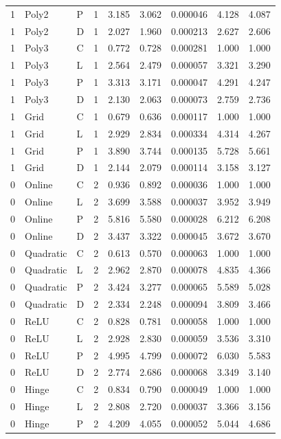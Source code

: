\begin{longtable}{lllrrrrrr}
1 & Poly2 & P & 1 & 3.185 & 3.062 & 0.000046 & 4.128 & 4.087 \\
1 & Poly2 & D & 1 & 2.027 & 1.960 & 0.000213 & 2.627 & 2.606 \\
1 & Poly3 & C & 1 & 0.772 & 0.728 & 0.000281 & 1.000 & 1.000 \\
1 & Poly3 & L & 1 & 2.564 & 2.479 & 0.000057 & 3.321 & 3.290 \\
1 & Poly3 & P & 1 & 3.313 & 3.171 & 0.000047 & 4.291 & 4.247 \\
1 & Poly3 & D & 1 & 2.130 & 2.063 & 0.000073 & 2.759 & 2.736 \\
1 & Grid & C & 1 & 0.679 & 0.636 & 0.000117 & 1.000 & 1.000 \\
1 & Grid & L & 1 & 2.929 & 2.834 & 0.000334 & 4.314 & 4.267 \\
1 & Grid & P & 1 & 3.890 & 3.744 & 0.000135 & 5.728 & 5.661 \\
1 & Grid & D & 1 & 2.144 & 2.079 & 0.000114 & 3.158 & 3.127 \\
0 & Online & C & 2 & 0.936 & 0.892 & 0.000036 & 1.000 & 1.000 \\
0 & Online & L & 2 & 3.699 & 3.588 & 0.000037 & 3.952 & 3.949 \\
0 & Online & P & 2 & 5.816 & 5.580 & 0.000028 & 6.212 & 6.208 \\
0 & Online & D & 2 & 3.437 & 3.322 & 0.000045 & 3.672 & 3.670 \\
0 & Quadratic & C & 2 & 0.613 & 0.570 & 0.000063 & 1.000 & 1.000 \\
0 & Quadratic & L & 2 & 2.962 & 2.870 & 0.000078 & 4.835 & 4.366 \\
0 & Quadratic & P & 2 & 3.424 & 3.277 & 0.000065 & 5.589 & 5.028 \\
0 & Quadratic & D & 2 & 2.334 & 2.248 & 0.000094 & 3.809 & 3.466 \\
0 & ReLU & C & 2 & 0.828 & 0.781 & 0.000058 & 1.000 & 1.000 \\
0 & ReLU & L & 2 & 2.928 & 2.830 & 0.000059 & 3.536 & 3.310 \\
0 & ReLU & P & 2 & 4.995 & 4.799 & 0.000072 & 6.030 & 5.583 \\
0 & ReLU & D & 2 & 2.774 & 2.686 & 0.000068 & 3.349 & 3.140 \\
0 & Hinge & C & 2 & 0.834 & 0.790 & 0.000049 & 1.000 & 1.000 \\
0 & Hinge & L & 2 & 2.808 & 2.720 & 0.000037 & 3.366 & 3.156 \\
0 & Hinge & P & 2 & 4.209 & 4.055 & 0.000052 & 5.044 & 4.686 \\

\end{longtable}
